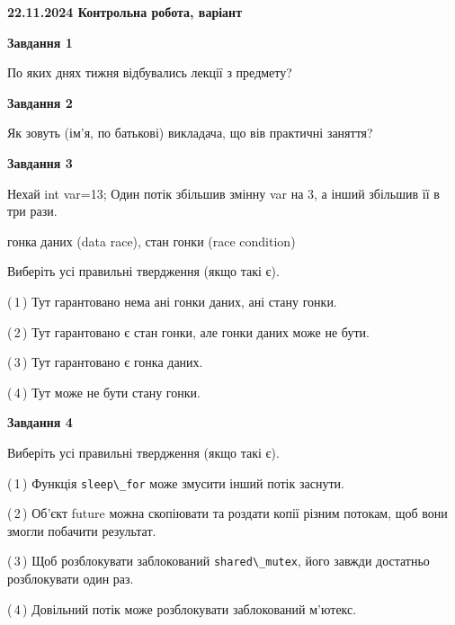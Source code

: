 \documentclass[12pt, ukrainian]{article}
\def\code#1{\Verb!#1!}
\begin{document}
\begin {large}

\textbf{22.11.2024 Контрольна робота, варіант  }\par


{

\begin{center}
\textbf{Завдання 1}
\end{center}

По яких днях тижня відбувались лекції з предмету?


\begin{center}
\textbf{Завдання 2}
\end{center}

Як зовуть (ім'я, по батькові) викладача, що вів практичні заняття?


\begin{center}
\textbf{Завдання 3}
\end{center}

Нехай int var=13; Один потік збільшив змінну var на 3, а інший збільшив її в три рази.

гонка даних (data race), стан гонки (race condition)

Виберіть усі правильні твердження (якщо такі є).\par
\vspace{2mm}
(\,1\,) Тут гарантовано нема ані гонки даних, ані стану гонки.%

(\,2\,) Тут гарантовано є стан гонки, але гонки даних може не бути.%

(\,3\,) Тут гарантовано є гонка даних.%

(\,4\,) Тут може не бути стану гонки.%


\begin{center}
\textbf{Завдання 4}
\end{center}

Виберіть усі правильні твердження (якщо такі є).\par
\vspace{2mm}

(\,1\,) Функція \code{sleep\_for} може змусити інший потік заснути.%

(\,2\,) Об’єкт future можна скопіювати та роздати копії різним потокам, щоб вони змогли побачити результат.%

(\,3\,) Щоб розблокувати заблокований \code{shared\_mutex}, його завжди достатньо розблокувати один раз.%

(\,4\,) Довільний потік може розблокувати заблокований м’ютекс.%


}
\end{large}
\end{document}
